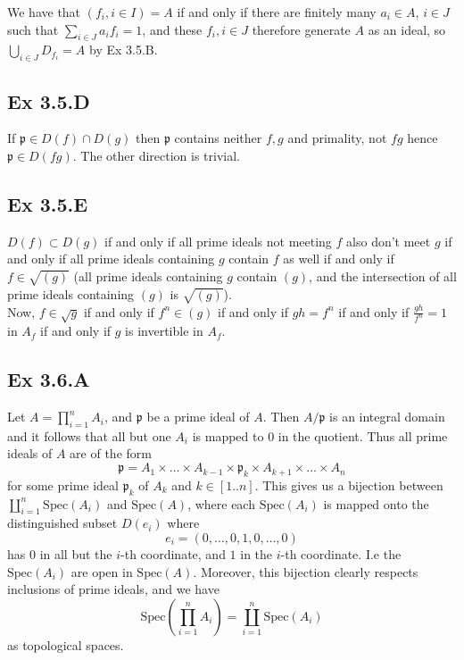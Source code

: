 \documentclass{article}
\theoremstyle{definition}
\newcommand{\Spec}{\text{Spec}}
\begin{document}
We have that $(f_i, i \in I) = A$ if and only if there are finitely many $a_i
	\in A$, $i \in J$ such that $\sum_{i \in J} a_i f_i = 1$, and these $f_i, i \in
	J$ therefore generate $A$ as an ideal, so $\bigcup_{i \in J} D_{f_i} = A$ by Ex
3.5.B.

\subsection*{Ex 3.5.D}

If $\mathfrak{p} \in D(f) \cap D(g)$ then $\mathfrak{p}$ contains neither $f,
	g$ and primality, not $fg$ hence $\mathfrak{p} \in D(fg)$. The other direction
is trivial.

\subsection*{Ex 3.5.E}

$D(f) \subset D(g)$ if and only if all prime ideals not meeting $f$ also don't
meet $g$ if and only if all prime ideals containing $g$ contain $f$ as well if
and only if $f \in \sqrt{(g)}$ (all prime ideals containing $g$ contain $(g)$,
and the intersection of all prime ideals containing $(g)$ is $\sqrt{(g)}$). \\

Now, $f \in \sqrt{g}$ if and only if $f^n \in (g)$ if and only if $gh = f^n$ if
and only if $\frac{gh}{f^n} = 1$ in $A_f$ if and only if $g$ is invertible in
$A_f$.

\subsection*{Ex 3.6.A}

Let $A = \prod_{i = 1}^{n} A_i$, and $\mathfrak{p}$ be a prime ideal of $A$.
Then $A/\mathfrak{p}$ is an integral domain and it follows that all but one
$A_i$ is mapped to $0$ in the quotient. Thus all prime ideals of $A$ are of the
form
\[
	\mathfrak{p}
	=
	A_1 \times \ldots \times A_{k - 1} \times \mathfrak{p}_k
	\times A_{k + 1} \times \ldots \times A_n
\]
for some prime ideal $\mathfrak{p}_k$ of $A_k$ and $k \in [1..n]$. This gives
us a bijection between $\coprod_{i = 1}^{n} \Spec(A_i)$ and $\Spec(A)$, where
each $\Spec(A_i)$ is mapped onto the distinguished subset $D(e_i)$ where
\[
	e_i = (0, \ldots, 0, 1, 0, \ldots, 0)
\]
has $0$ in all but the $i$-th coordinate, and $1$ in the $i$-th coordinate. I.e
the $\Spec(A_i)$ are open in $\Spec(A)$. Moreover, this bijection clearly
respects inclusions of prime ideals, and we have
\[
	\Spec\left(
	\prod_{i = 1}^{n} A_i
	\right)
	=
	\coprod_{i = 1}^{n} \Spec(A_i)
\]
as topological spaces.
\end{document}
